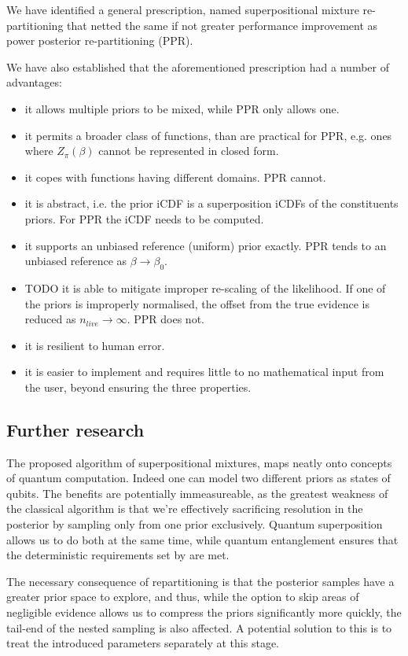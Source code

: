 \documentclass[usenatbib]{mnras}
\begin{document}
We have identified a general prescription, named superpositional
mixture re-partitioning that netted the same if not greater
performance improvement as power posterior re-partitioning (PPR). 

We have also established that the aforementioned prescription had a
number of advantages:
\begin{itemize}
\item it allows multiple priors to be mixed, while PPR only allows one.
\item it permits a broader class of functions, than are practical for
PPR, e.g. ones where \(Z_{\pi}(\beta)\) cannot be represented in
closed form.
\item it copes with functions having different domains. PPR cannot.
\item it is abstract, i.e. the prior iCDF is a superposition iCDFs of
the constituents priors. For PPR the iCDF needs to be computed.
\item it supports an unbiased reference (uniform) prior exactly. PPR
tends to an unbiased reference as \(\beta\rightarrow\beta_{0}\).
\item TODO it is able to mitigate improper re-scaling of the
likelihood. If one of the priors is improperly normalised, the
offset from the true evidence is reduced as
\(n_{live}\rightarrow\infty\). PPR does not.
\item it is resilient to human error.
\item it is easier to implement and requires little to no mathematical
input from the user, beyond ensuring the three properties.
\end{itemize}


\subsection{Further research}
\label{sec:orgdfd1a12}
The proposed algorithm of superpositional mixtures, maps neatly
onto concepts of quantum computation. Indeed one can model two
different priors as states of qubits. The benefits are potentially
immeasureable, as the greatest weakness of the classical algorithm
is that we're effectively sacrificing resolution in the posterior
by sampling only from one prior exclusively. Quantum superposition
allows us to do both at the same time, while quantum entanglement
ensures that the deterministic requirements set by
\citeauthor{skilling2006} are met.

The necessary consequence of repartitioning is that the posterior
samples have a greater prior space to explore, and thus, while the
option to skip areas of negligible evidence allows us to compress
the priors significantly more quickly, the tail-end of the nested
sampling is also affected. A potential solution to this is to treat
the introduced parameters separately at this stage.
\end{document}
